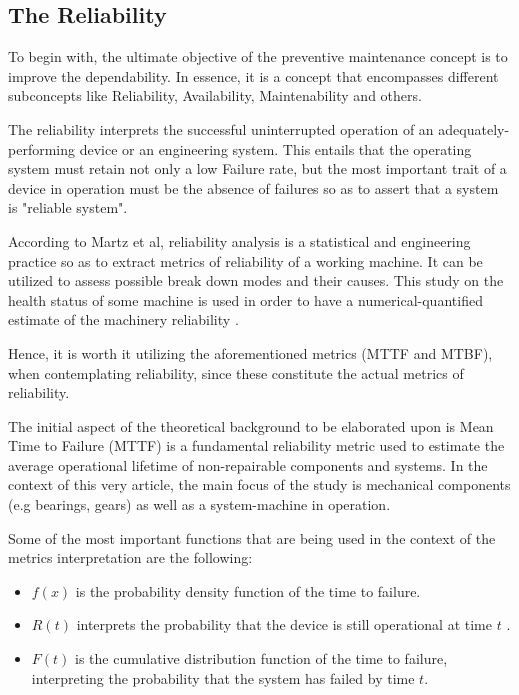 \subsection{The Reliability}
{	

	To begin with, the ultimate objective of the preventive maintenance concept is to improve the dependability. In essence, it is a concept that encompasses different subconcepts like Reliability, Availability, Maintenability and others. 
	
	
	The reliability interprets the successful uninterrupted operation of an adequately-performing device or an engineering system. This entails that the operating system must retain not only a low Failure rate, but the most important trait of a device in operation must be the absence of failures so as to assert that a system is "reliable system".
	
	According to Martz et al, reliability analysis is a statistical and engineering practice so as to extract metrics of reliability of a working machine. It can be utilized to assess possible break down modes and their causes. This study on the health status of some machine is used in order to have a numerical-quantified estimate of the machinery reliability \cite{Martz2001}.
	
	Hence, it is worth it utilizing the aforementioned metrics (MTTF and MTBF), when contemplating reliability, since these constitute the actual metrics of reliability.
	
	The initial aspect of the theoretical background to be elaborated upon is Mean Time to Failure (MTTF) is a fundamental reliability metric used to estimate the average operational lifetime of non-repairable components and systems. In the context of this very article, the main focus of the study is mechanical components (e.g bearings, gears) as well as a system-machine in operation.
	
	Some of the most important functions that are being used in the context of the metrics interpretation are the following:
	
	\begin{itemize}
		\item \( f(x) \) is the probability density function of the time to failure.
		\item \( R(t) \) interprets the probability that the device is still operational at time \( t \) \cite{Martz2001}.
		\item \( F(t) \) is the cumulative distribution function of the time to failure, interpreting the probability that the system has failed by time \( t \).
	\end{itemize}
	
}
